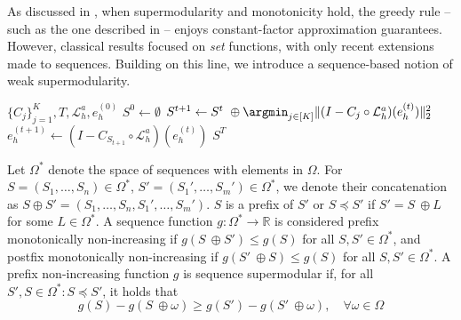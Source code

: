 \documentclass{article} %
\begin{document}
As discussed in , when supermodularity and monotonicity hold, the greedy rule -- such as the one described in  -- enjoys constant-factor approximation guarantees. However, classical results focused on \textit{set} functions, with only recent extensions made to sequences. Building on this line, we introduce a sequence-based notion of weak supermodularity.

\begin{algorithm} 
\caption{Greedy Algorithm for a Hybrid PDE solver}\label{alg:greedy}
\begin{algorithmic}
\Require $\{C_{j}\}_{j = 1}^{K}, T, \mathcal{L}_h^a, e^{(0)}_h$
\State $S^{0} \gets \emptyset$
    \State $S^{t + 1} \gets S^{t} \ \oplus \argmin_{j \in [K]}\|( I - C_{j} \circ \mathcal{L}_{h}^a)(e^{(t)}_h)\|^2_2$
    \State $e^{(t + 1)}_h \gets (I - C_{S_{t+ 1}} \circ \mathcal{L}_{h}^a) (e^{(t)}_h)$
\EndFor
\State \Return $S^{T}$
\end{algorithmic}
\end{algorithm}

Let $\Omega^*$ denote the space of sequences with elements in $\Omega$. For $S = (S_1, \dots, S_n) \in \Omega^*$,  $S' = (S_1', \dots, S_m') \in \Omega^*$, we denote their concatenation as $S \oplus S' = (S_1, \dots, S_n, S_1', \dots, S_m')$. $S$ is a prefix of $S'$ or $S \preceq S'$ if $S' = S \ \oplus L$ for some $L \in \Omega^*$.
A sequence function $g: \Omega^* \to \mathbb{R}$ is considered prefix monotonically non-increasing if $g(S \ \oplus S') \leq g(S)$ for all $S, S' \in \Omega^*$, and postfix monotonically non-increasing if $g(S' \ \oplus S) \leq g(S)$ for all $S, S' \in \Omega^*$. A prefix non-increasing function $g$ is sequence supermodular if, for all $S', S \in \Omega^*: S \preceq S'$, it holds that
\begin{equation}\label{eqn:supermod}
    g(S) - g(S \ \oplus \omega ) \geq g(S') - g(S' \ \oplus \omega ), \quad \forall \omega \in \Omega
\end{equation}
\end{document}
